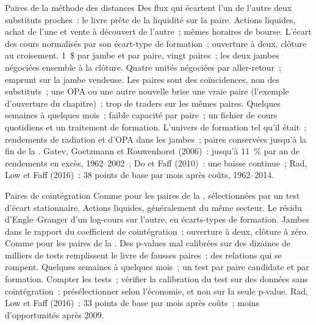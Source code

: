 \begin{strategyfile}{Paires de la méthode des distances}\label{strat:s1:pairs-and-baskets:distance}
 Des flux qui écartent l'un de l'autre deux substituts proches~: le livre prête de la liquidité sur la paire.
 Actions liquides, achat de l'une et vente à découvert de l'autre~; mêmes horaires de bourse.
 L'écart des cours normalisés par son écart-type de formation~; ouverture à deux, clôture au croisement.
 1~\$ par jambe et par paire, vingt paires~; les deux jambes négociées ensemble à la clôture.
 Quatre unités négociées par aller-retour~; emprunt sur la jambe vendeuse.
 Les paires sont des coïncidences, non des substituts~; une OPA ou une autre nouvelle brise une vraie paire (l'exemple d'ouverture du chapitre)~; trop de traders
sur les mêmes paires.
 Quelques semaines à quelques mois~; faible capacité par paire~; un fichier de cours quotidiens et un traitement de formation.
 L'univers de formation tel qu'il était~; rendements de radiation et d'OPA dans les jambes~; paires conservées jusqu'à la fin de la .
 Gatev, Goetzmann et Rouwenhorst (2006)~: jusqu'à 11~\% par an de rendements en excès, 1962--2002~; Do et Faff (2010)~: une baisse continue~; Rad,
Low et Faff (2016)~: 38 points de base par mois après coûts, 1962--2014.
\end{strategyfile}

\begin{strategyfile}{Paires de cointégration}\label{strat:s1:pairs-and-baskets:coint}
 Comme pour les paires de la , sélectionnées par un test d'écart stationnaire.
 Actions liquides, généralement du même secteur.
 Le résidu d'Engle--Granger d'un log-cours sur l'autre, en écarts-types de formation.
 Jambes dans le rapport du coefficient de cointégration~; ouverture à deux, clôture à zéro.
 Comme pour les paires de la .
 Des p-values mal calibrées sur des dizaines de milliers de tests remplissent le livre de fausses paires~; des relations qui se rompent.
 Quelques semaines à quelques mois~; un test par paire candidate et par formation.
 Compter les tests~; vérifier la calibration du test sur des données sans cointégration~; présélectionner selon l'économie, et non sur la seule p-value.
 Rad, Low et Faff (2016)~: 33 points de base par mois après coûts~; moins d'opportunités après 2009.
\end{strategyfile}

